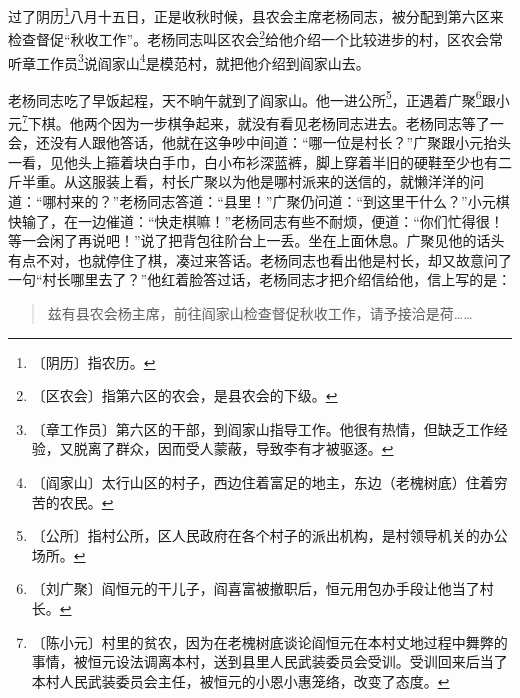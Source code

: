 \documentclass[12pt,UTF-8,openany]{ctexbook}
\begin{document}
\begin{normalsize}
    
    过了阴历\footnote{〔阴历〕指农历。}八月十五日，正是收秋时候，县农会主席老杨同志，被分配到第六区来检查督促“秋收工作”。老杨同志叫区农会\footnote{〔区农会〕指第六区的农会，是县农会的下级。}给他介绍一个比较进步的村，区农会常听章工作员\footnote{〔章工作员〕第六区的干部，到阎家山指导工作。他很有热情，但缺乏工作经验，又脱离了群众，因而受人蒙蔽，导致李有才被驱逐。}说阎家山\footnote{〔阎家山〕太行山区的村子，西边住着富足的地主，东边（老槐树底）住着穷苦的农民。}是模范村，就把他介绍到阎家山去。
    
    老杨同志吃了早饭起程，天不晌午就到了阎家山。他一进公所\footnote{〔公所〕指村公所，区人民政府在各个村子的派出机构，是村领导机关的办公场所。}，正遇着广聚\footnote{〔刘广聚〕阎恒元的干儿子，阎喜富被撤职后，恒元用包办手段让他当了村长。}跟小元\footnote{〔陈小元〕村里的贫农，因为在老槐树底谈论阎恒元在本村丈地过程中舞弊的事情，被恒元设法调离本村，送到县里人民武装委员会受训。受训回来后当了本村人民武装委员会主任，被恒元的小恩小惠笼络，改变了态度。}下棋。他两个因为一步棋争起来，就没有看见老杨同志进去。老杨同志等了一会，还没有人跟他答话，他就在这争吵中间道：“哪一位是村长？”广聚跟小元抬头一看，见他头上箍着块白手巾，白小布衫深蓝裤，脚上穿着半旧的硬鞋至少也有二斤半重。从这服装上看，村长广聚以为他是哪村派来的送信的，就懒洋洋的问道：“哪村来的？”老杨同志答道：“县里！”广聚仍问道：“到这里干什么？”小元棋快输了，在一边催道：“快走棋嘛！”老杨同志有些不耐烦，便道：“你们忙得很！等一会闲了再说吧！”说了把背包往阶台上一丢。坐在上面休息。广聚见他的话头有点不对，也就停住了棋，凑过来答话。老杨同志也看出他是村长，却又故意问了一句“村长哪里去了？”他红着脸答过话，老杨同志才把介绍信给他，信上写的是：
    
    \begin{quotation}
    
    兹有县农会杨主席，前往阎家山检查督促秋收工作，请予接洽是荷……
    
    \end{quotation}
    

\end{normalsize}
\end{document}
